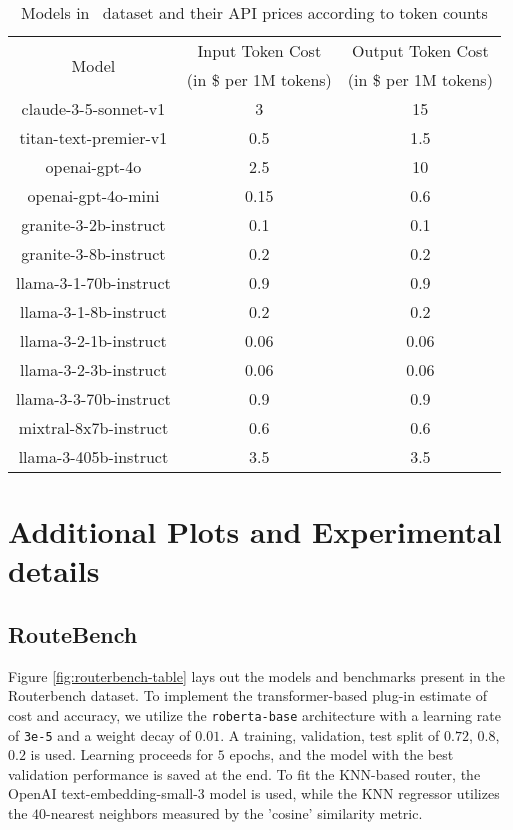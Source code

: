 

\begin{table}
    \centering
    \begin{tabular}{c c c } 
 \toprule
 \multirow{2}{*}{Model} & Input Token Cost & Output Token Cost\\
 & (in \$ per 1M tokens) & (in \$ per 1M tokens)\\
 \hline\hline
 claude-3-5-sonnet-v1 & 3 & 15  \\ 
 \hline
 titan-text-premier-v1 & 0.5 & 1.5  \\
 \hline
 openai-gpt-4o & 2.5 & 10  \\
 \hline
 openai-gpt-4o-mini & 0.15 & 0.6  \\
 \hline
 granite-3-2b-instruct & 0.1 & 0.1  \\ 
 \hline
 granite-3-8b-instruct & 0.2 & 0.2  \\
 \hline
 llama-3-1-70b-instruct & 0.9 & 0.9  \\ 
 \hline
 llama-3-1-8b-instruct & 0.2 & 0.2  \\ 
 \hline
  llama-3-2-1b-instruct & 0.06 & 0.06  \\ 
 \hline
 llama-3-2-3b-instruct & 0.06 & 0.06  \\ 
 \hline
 llama-3-3-70b-instruct & 0.9 & 0.9  \\ 
 \hline
 mixtral-8x7b-instruct & 0.6 & 0.6  \\ 
 \hline
 llama-3-405b-instruct & 3.5 & 3.5  \\ 
 \bottomrule
\end{tabular}
\caption{Models in \newdata\ dataset and their API prices according to token counts}
    \label{tab:price_by_token_newdata}
\end{table}







\section{Additional Plots and Experimental details}
\subsection{RouteBench}
Figure \ref{fig:routerbench-table} lays out the models and benchmarks present in the Routerbench dataset. To implement the transformer-based plug-in estimate of cost and accuracy, we utilize the \texttt{roberta-base} architecture with a learning rate of \texttt{3e-5} and a weight decay of $0.01$. A training, validation, test split of $0.72$, $0.8$, $0.2$ is used. Learning proceeds for $5$ epochs, and the model with the best validation performance is saved at the end. To fit the KNN-based router, the OpenAI text-embedding-small-3 model is used, while the KNN regressor utilizes the $40$-nearest neighbors measured by the 'cosine' similarity metric.

